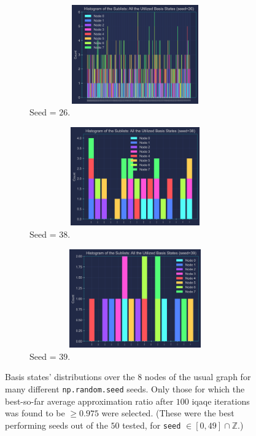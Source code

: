 
\clearpage

\begin{figure}[ht!]
  \addtocounter{figure}{-1} %
  \centering
  \begin{subfigure}[t]{0.325\textwidth}
      \addtocounter{subfigure}{2} %
      \centering
      \includegraphics[width=1\textwidth,height=4.25cm]{Figures/Chapter_5/Random iQAQE (Coloured plots)/8-node(seed=26).png}
      \caption{Seed = $26$.}
      \label{fig:seed=26}
  \end{subfigure}
  \hfill
  \begin{subfigure}[t]{0.325\textwidth}
      \centering
      \includegraphics[width=1\textwidth,height=4.25cm]{Figures/Chapter_5/Random iQAQE (Coloured plots)/8-node(seed=38).png}
      \caption{Seed = $38$.}
      \label{fig:seed=38}
  \end{subfigure}
  \hfill
  \begin{subfigure}[t]{0.325\textwidth}
      \centering
      \includegraphics[width=1\textwidth,height=4.25cm]{Figures/Chapter_5/Random iQAQE (Coloured plots)/8-node(seed=39).png}
      \caption{Seed = $39$.}
      \label{fig:seed=39}
  \end{subfigure}
  \caption{Basis states' distributions over the $8$ nodes of the usual graph for many different \texttt{np.random.seed} seeds. Only those for which the best-so-far average approximation ratio after $100$ \acrshort{iqaqe} iterations was found to be $\geq 0.975$ were selected. (These were the best performing seeds out of the $50$ tested, for \texttt{seed} $\in \left[0, 49\right] \cap \mathbb{Z}$.)}
  \label{fig:Random_iQAQE(Seeds)}
\end{figure}

